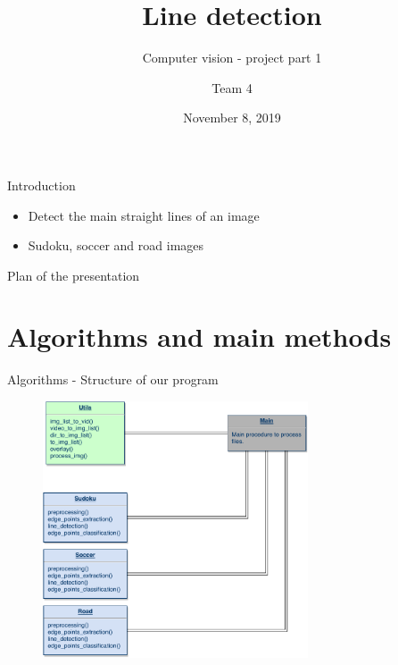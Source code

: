 \documentclass[12pt]{beamer}
\title{Line detection}
\subtitle{Computer vision - project part 1}
\author{Team 4}
\institute{University of Liège}
\date{November 8, 2019}
\begin{document}
\maketitle

\begin{frame}{Introduction}
    \begin{itemize}
        \item<1-> Detect the main \alert{straight} lines of an image
        \item<2-> Sudoku, soccer and road images
    \end{itemize}
\end{frame}

\begin{frame}{Plan of the presentation}
    \tableofcontents
\end{frame}

\section{Algorithms and main methods}

\begin{frame}{Algorithms - Structure of our program}
    \begin{figure}
        \includegraphics[width=0.7\textwidth]{resources/pdf/uml.pdf}
    \end{figure}
\end{frame}
\end{document}
